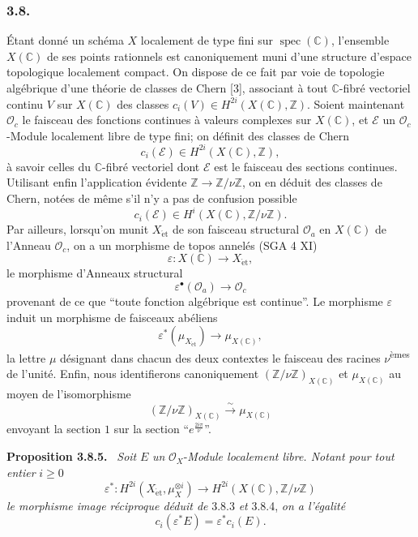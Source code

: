 \documentclass[11pt]{article}
\newenvironment{statement}[1]{\par\medskip\noindent\textbf{#1.}\ }{\par\medskip}
\providecommand{\et}{\mathrm{\acute{e}t}}
\providecommand{\et}{\acute{e}t}
\begin{document}
\subsubsection*{3.8.}
Étant donné un schéma $X$ localement de type fini sur $\operatorname{spec}(\mathbb C)$, l'ensemble $X(\mathbb C)$ de ses points rationnels est canoniquement muni d'une structure d'espace topologique localement compact. On dispose de ce fait par voie de topologie algébrique d'une théorie de classes de Chern [3], associant à tout $\mathbb C$-fibré vectoriel continu $V$ sur $X(\mathbb C)$ des classes $c_i(V)\in H^{2i}(X(\mathbb C),\mathbb Z)$. Soient maintenant $\mathcal O_c$ le faisceau des fonctions continues à valeurs complexes sur $X(\mathbb C)$, et $\mathcal E$ un $\mathcal O_c$-Module localement libre de type fini; on définit des classes de Chern
\[
c_i(\mathcal E)\in H^{2i}(X(\mathbb C),\mathbb Z),
\]
à savoir celles du $\mathbb C$-fibré vectoriel dont $\mathcal E$ est le faisceau des sections continues. Utilisant enfin l'application évidente $\mathbb Z\to\mathbb Z/\nu\mathbb Z$, on en déduit des classes de Chern, notées de même s'il n'y a pas de confusion possible
\[
c_i(\mathcal E)\in H^i(X(\mathbb C),\mathbb Z/\nu\mathbb Z).
\tag{3.8.1}
\]
Par
ailleurs, lorsqu'on munit $X_{\et}$ de son faisceau structural $\mathcal O_a$ en $X(\mathbb C)$ de l'Anneau $\mathcal O_c$, on a un morphisme de topos annelés (SGA 4 XI)
\[
\varepsilon:X(\mathbb C)\to X_{\et},
\]
le morphisme d'Anneaux structural
\[
\varepsilon^{\bullet}(\mathcal O_a)\to\mathcal O_c
\tag{3.8.2}
\]
provenant de ce que ``toute fonction algébrique est continue''. Le morphisme $\varepsilon$ induit un morphisme de faisceaux abéliens
\[
\varepsilon^*(\mu_{X_{\et}})\to \mu_{X(\mathbb C)},
\tag{3.8.3}
\]
la lettre $\mu$ désignant dans chacun des deux contextes le faisceau des racines $\nu$\textsuperscript{èmes} de l'unité. Enfin, nous identifierons canoniquement $(\mathbb Z/\nu\mathbb Z)_{X(\mathbb C)}$ et $\mu_{X(\mathbb C)}$ au moyen de l'isomorphisme
\[
(\mathbb Z/\nu\mathbb Z)_{X(\mathbb C)}
 \xrightarrow{\sim}\mu_{X(\mathbb C)}
\tag{3.8.4}
\]
envoyant la section $1$ sur la section ``$e^{\frac{2i\pi}{\nu}}$''.

\begin{statement}{Proposition 3.8.5}
\emph{Soit} $E$ \emph{un} $\mathcal O_X$-\emph{Module localement libre. Notant pour tout entier} $i\ge0$
\[
\varepsilon^*:H^{2i}(X_{\et},\mu_X^{\otimes i})
\to H^{2i}(X(\mathbb C),\mathbb Z/\nu\mathbb Z)
\]
\emph{le morphisme image réciproque déduit de} 3.8.3 \emph{et} 3.8.4, \emph{on a l'égalité}
\[
c_i(\varepsilon^*E)=\varepsilon^*c_i(E).
\]
\end{statement}
\end{document}
